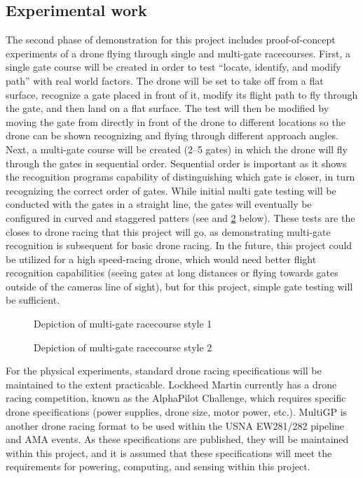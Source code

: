 \documentclass[onecolumn,10pt]{IEEEtran}
\begin{document}
\subsection{Experimental work}
The second phase of demonstration for this project includes proof-of-concept experiments of a drone flying through single and multi-gate racecourses. First, a single gate course will be created in order to test ``locate, identify, and modify path'' with real world factors. The drone will be set to take off from a flat surface, recognize a gate placed in front of it, modify its flight path to fly through the gate, and then land on a flat surface. The test will then be modified by moving the gate from directly in front of the drone to different locations so the drone can be shown recognizing and flying through different approach angles. Next, a multi-gate course will be created (2--5 gates) in which the drone will fly through the gates in sequential order. Sequential order is important as it shows the recognition programs capability of distinguishing which gate is closer, in turn recognizing the correct order of gates.  While initial multi gate testing will be conducted with the gates in a straight line, the gates will eventually be configured in curved and staggered patters (see  and \ref{fig:gate-style-2} below). These tests are the closes to drone racing that this project will go, as demonstrating multi-gate recognition is subsequent for basic drone racing. In the future, this project could be utilized for a high speed-racing drone, which would need better flight recognition capabilities (seeing gates at long distances or flying towards gates outside of the cameras line of sight), but for this project, simple gate testing will be sufficient.
\begin{figure}
\caption{Depiction of multi-gate racecourse style 1}
\label{fig:gate-style-1}
\end{figure}

\begin{figure}
\caption{Depiction of multi-gate racecourse style 2}
\label{fig:gate-style-2}
\end{figure}

For the physical experiments, standard drone racing specifications will be maintained to the extent practicable. Lockheed Martin currently has a drone racing competition, known as the AlphaPilot Challenge, which requires specific drone specifications (power supplies, drone size, motor power, etc.). MultiGP is another drone racing format to be used within the USNA EW281/282 pipeline and AMA events.  As these specifications are published, they will be maintained within this project, and it is assumed that these specifications will meet the requirements for powering, computing, and sensing within this project.
\end{document}
